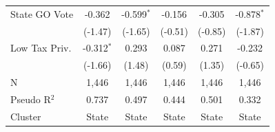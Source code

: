 \begin{tabular*}{\textwidth}{@{\extracolsep{\fill}}lccccc}
   State GO Vote        & -0.362         & -0.599$^{*}$  & -0.156        & -0.305         & -0.878$^{*}$\\   
                        & (-1.47)       & (-1.65)      & (-0.51)      & (-0.85)       & (-1.87)\\   
   Low Tax Priv.        & -0.312$^{*}$   & 0.293         & 0.087         & 0.271          & -0.232\\   
                        & (-1.66)       & (1.48)       & (0.59)       & (1.35)        & (-0.65)\\   
   \hline
   N         & 1,446          & 1,446         & 1,446         & 1,446          & 1,446\\  
   Pseudo R$^2$         & 0.737          & 0.497         & 0.444         & 0.501          & 0.332\\  
   Cluster              & State & State & State & State & State\\  
   \bottomrule
\end{tabular*}
\par\endgroup
